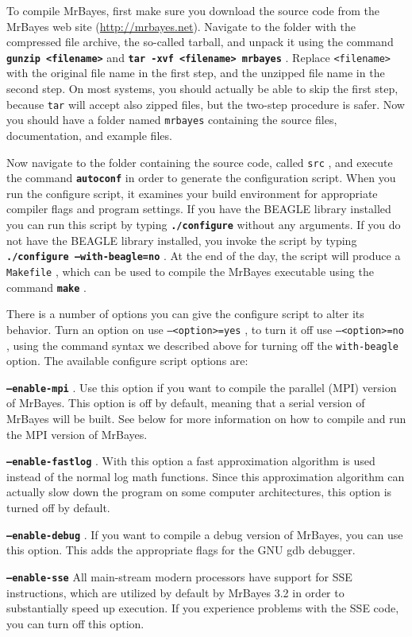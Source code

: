 \documentclass[12pt]{book}
\newcommand{\ttt}[1]{\texttt{#1} }
\newcommand{\tb}[1]{\texttt{\textbf{#1}} }
\begin{document}
To compile MrBayes, first make sure you download the source code from the MrBayes web site
(\url{http://mrbayes.net}). Navigate to the folder with the compressed file archive, the so-called tarball, and
unpack it using the command \tb{gunzip <filename>} and \tb{tar -xvf <filename> mrbayes}. Replace
\ttt{<filename>} with the original file name in the first step, and the unzipped file name in the second step.
On most systems, you should actually be able to skip the first step, because \ttt{tar} will accept also zipped
files, but the two-step procedure is safer. Now you should have a folder named \ttt{mrbayes} containing the
source files, documentation, and example files.

Now navigate to the folder containing the source code, called \ttt{src}, and execute the command
\tb{autoconf} in order to generate the configuration script. 
When you run the configure script, it examines your build environment for 
appropriate compiler flags and program settings. If you have the BEAGLE library installed you can run this 
script by typing \tb{./configure} without any arguments.  If you do not have the BEAGLE library installed,
you invoke the script by typing \tb{./configure --with-beagle=no}. At the end of the day, the script will produce
a \ttt{Makefile}, which can be used to compile the MrBayes executable using the command \tb{make}.

There is a number of options you can give the configure script to alter its behavior. Turn an option on use
\ttt{--<option>=yes}, to turn it off use \ttt{--<option>=no}, using the command syntax we described above
for turning off the \ttt{with-beagle} option. The available configure script options are:

\tb{--enable-mpi}. Use this option if you want to compile the parallel (MPI) version of MrBayes. This option 
is off by default, meaning that a serial version of MrBayes will be built. See below for more information on 
how to compile and run the MPI version of MrBayes.

\tb{--enable-fastlog}. With this option a fast approximation algorithm is used instead of the normal log  
math functions. Since this approximation algorithm can actually slow down the program on some computer 
architectures, this option is turned off by default. 

\tb{--enable-debug}. If you want to compile a debug version of MrBayes, you can use this option. This adds 
the appropriate flags for the GNU gdb debugger. 

\tb{--enable-sse}    All main-stream modern processors have support for SSE instructions, which are utilized 
by default by MrBayes 3.2 in order to substantially speed up execution. If you experience problems with the
SSE code, you can turn off this option.
\end{document}
